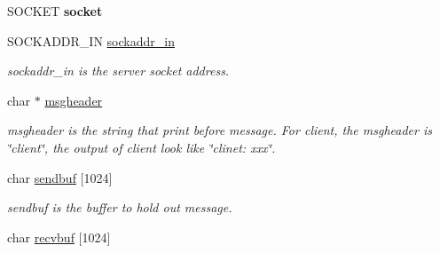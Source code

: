 \begin{DoxyCompactItemize}
\item 
\hypertarget{structclient__udp_a70775722180fc3f294df577a10d3d24c}{}S\+O\+C\+K\+E\+T {\bfseries socket}\label{structclient__udp_a70775722180fc3f294df577a10d3d24c}

\item 
\hypertarget{structclient__udp_a5d50f87eae53ee83b0afad9973b0fa60}{}S\+O\+C\+K\+A\+D\+D\+R\+\_\+\+I\+N \hyperlink{structclient__udp_a5d50f87eae53ee83b0afad9973b0fa60}{sockaddr\+\_\+in}\label{structclient__udp_a5d50f87eae53ee83b0afad9973b0fa60}

\begin{DoxyCompactList}\small\item\em sockaddr\+\_\+in is the server socket address. \end{DoxyCompactList}\item 
\hypertarget{structclient__udp_ab3693bfee57c4ff92bbd9242f5f55a80}{}char $\ast$ \hyperlink{structclient__udp_ab3693bfee57c4ff92bbd9242f5f55a80}{msgheader}\label{structclient__udp_ab3693bfee57c4ff92bbd9242f5f55a80}

\begin{DoxyCompactList}\small\item\em msgheader is the string that print before message. For client, the msgheader is \char`\"{}client\char`\"{}, the output of client look like \char`\"{}clinet\+: xxx\char`\"{}. \end{DoxyCompactList}\item 
\hypertarget{structclient__udp_a03a005674d8e48587f5114ae03f74ccf}{}char \hyperlink{structclient__udp_a03a005674d8e48587f5114ae03f74ccf}{sendbuf} \mbox{[}1024\mbox{]}\label{structclient__udp_a03a005674d8e48587f5114ae03f74ccf}

\begin{DoxyCompactList}\small\item\em sendbuf is the buffer to hold out message. \end{DoxyCompactList}\item 
\hypertarget{structclient__udp_a3d13f8e36511cbd5e42fe49a0eb77e90}{}char \hyperlink{structclient__udp_a3d13f8e36511cbd5e42fe49a0eb77e90}{recvbuf} \mbox{[}1024\mbox{]}\label{structclient__udp_a3d13f8e36511cbd5e42fe49a0eb77e90}


\end{DoxyCompactItemize}
